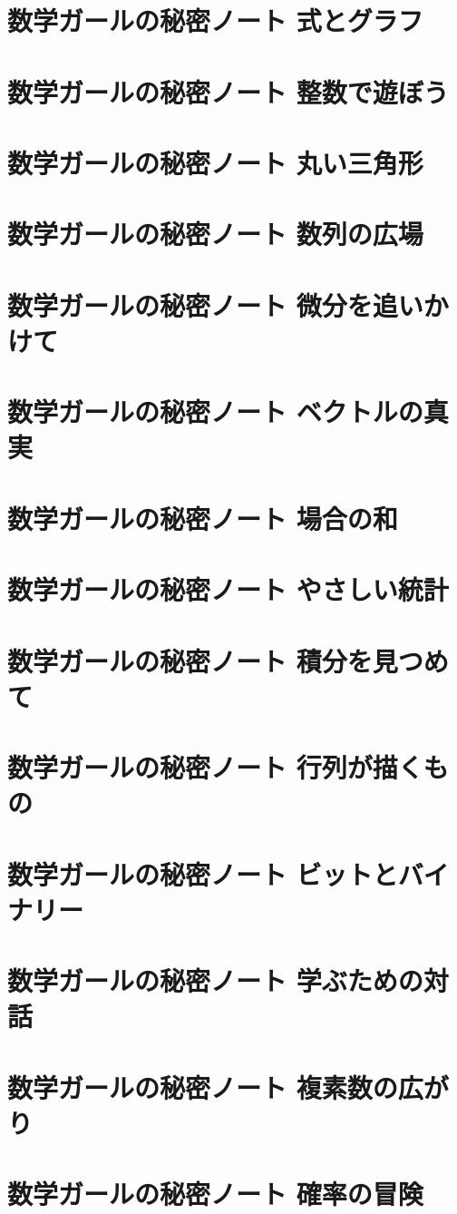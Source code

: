 \documentclass[a4j,uplatex,11pt]{jsarticle}
\begin{document}
\section{数学ガールの秘密ノート 式とグラフ}
\section{数学ガールの秘密ノート 整数で遊ぼう}
\section{数学ガールの秘密ノート 丸い三角形}
\section{数学ガールの秘密ノート 数列の広場}
\section{数学ガールの秘密ノート 微分を追いかけて}
\section{数学ガールの秘密ノート ベクトルの真実}
\section{数学ガールの秘密ノート 場合の和}
\section{数学ガールの秘密ノート やさしい統計}
\section{数学ガールの秘密ノート 積分を見つめて}
\section{数学ガールの秘密ノート 行列が描くもの}
\section{数学ガールの秘密ノート ビットとバイナリー}
\section{数学ガールの秘密ノート 学ぶための対話}
\section{数学ガールの秘密ノート 複素数の広がり}
\section{数学ガールの秘密ノート 確率の冒険}

\newpage



\end{document}
